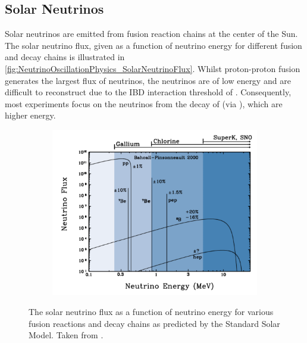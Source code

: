 \subsection{Solar Neutrinos}
\label{subsec:NeutrinoOscillationPhysics_SolarNeutrinos}

Solar neutrinos are emitted from fusion reaction chains at the center of the Sun. The solar neutrino flux, given as a function of neutrino energy for different fusion and decay chains is illustrated in \autoref{fig:NeutrinoOscillationPhysics_SolarNeutrinoFlux}. Whilst proton-proton fusion generates the largest flux of neutrinos, the neutrinos are of low energy and are difficult to reconstruct due to the IBD interaction threshold of . Consequently, most experiments focus on the neutrinos from the decay of  (via ), which are higher energy.

\begin{figure}[h]
  \begin{subfigure}[t]{0.80\textwidth}
    \includegraphics[width=\textwidth, trim={0mm 0mm 0mm 0mm}, clip,page=1]{Figures/Theory/SolarNeutrinoFlux.pdf}
  \end{subfigure}
  \caption{The solar neutrino flux as a function of neutrino energy for various fusion reactions and decay chains as predicted by the Standard Solar Model. Taken from \cite{Bellerive2004-ur}.}
  \label{fig:NeutrinoOscillationPhysics_SolarNeutrinoFlux}
\end{figure}

